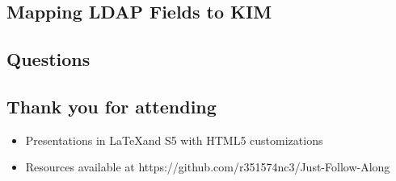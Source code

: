 \documentclass[12pt,notitlepage]{article}
\begin{document}
\begin{s5presentation}
\begin{s5slide}
    \W \end{s5slide}

%
%
  \W \begin{s5slide}
    \section{Mapping LDAP Fields to KIM}

    \W \end{s5slide}

%
%
  \W \begin{s5slide}
    \section{Questions}
    \W \end{s5slide}

%
%
  \W \begin{s5slide}
    \section{Thank you for attending }
    \begin{itemize}
      \item Presentations in \LaTeX and S5 with HTML5 customizations
      \item Resources available at https://github.com/r351574nc3/Just-Follow-Along
      \end{itemize}
    \W \end{s5slide}
  \W \end{s5presentation}
\end{document}
